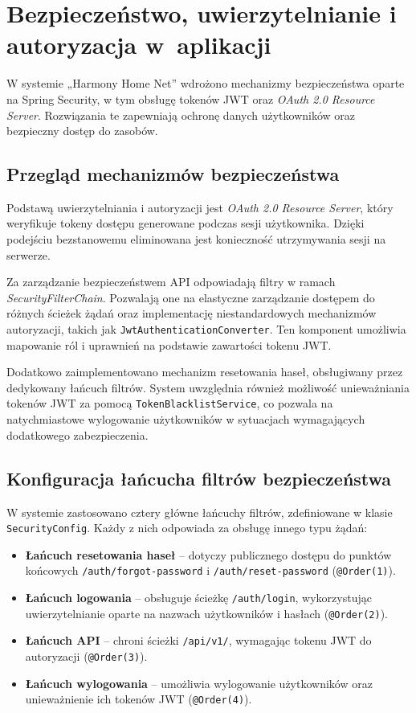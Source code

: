 \section{Bezpieczeństwo, uwierzytelnianie i autoryzacja w~aplikacji}

W systemie „Harmony Home Net” wdrożono mechanizmy bezpieczeństwa oparte na Spring Security, w tym obsługę tokenów JWT oraz \emph{OAuth 2.0 Resource Server}. Rozwiązania te zapewniają ochronę danych użytkowników oraz bezpieczny dostęp do zasobów.

\subsection{Przegląd mechanizmów bezpieczeństwa}

Podstawą uwierzytelniania i autoryzacji jest \emph{OAuth 2.0 Resource Server}, który weryfikuje tokeny dostępu generowane podczas sesji użytkownika. Dzięki podejściu bezstanowemu eliminowana jest konieczność utrzymywania sesji na serwerze. 

Za zarządzanie bezpieczeństwem API odpowiadają filtry w ramach \emph{SecurityFilterChain}. Pozwalają one na elastyczne zarządzanie dostępem do różnych ścieżek żądań oraz implementację niestandardowych mechanizmów autoryzacji, takich jak \texttt{JwtAuthenticationConverter}. Ten komponent umożliwia mapowanie ról i uprawnień na podstawie zawartości tokenu JWT.

Dodatkowo zaimplementowano mechanizm resetowania haseł, obsługiwany przez dedykowany łańcuch filtrów. System uwzględnia również możliwość unieważniania tokenów JWT za pomocą \texttt{TokenBlacklistService}, co pozwala na natychmiastowe wylogowanie użytkowników w sytuacjach wymagających dodatkowego zabezpieczenia.

\subsection{Konfiguracja łańcucha filtrów bezpieczeństwa}

W systemie zastosowano cztery główne łańcuchy filtrów, zdefiniowane w klasie \texttt{SecurityConfig}. Każdy z nich odpowiada za obsługę innego typu żądań:

\begin{itemize}
    \item \textbf{Łańcuch resetowania haseł} -- dotyczy publicznego dostępu do punktów końcowych \texttt{/auth/forgot-password} i \texttt{/auth/reset-password} (\texttt{@Order(1)}).
    \item \textbf{Łańcuch logowania} -- obsługuje ścieżkę \texttt{/auth/login}, wykorzystując uwierzytelnianie oparte na nazwach użytkowników i hasłach (\texttt{@Order(2)}).
    \item \textbf{Łańcuch API} -- chroni ścieżki \texttt{/api/v1/}, wymagając tokenu JWT do autoryzacji (\texttt{@Order(3)}).
    \item \textbf{Łańcuch wylogowania} -- umożliwia wylogowanie użytkowników oraz unieważnienie ich tokenów JWT (\texttt{@Order(4)}).
\end{itemize}

